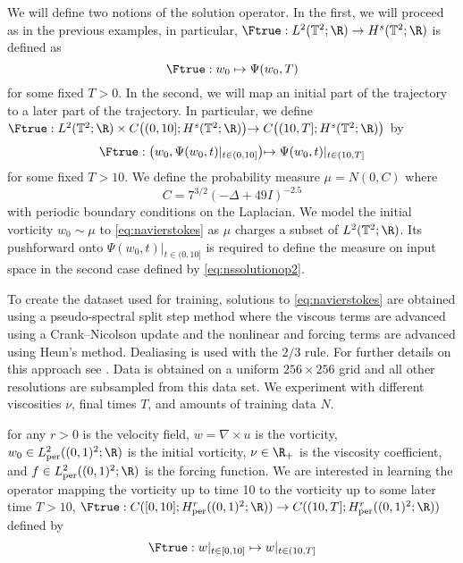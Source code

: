 We will define two notions of the solution operator. In the first, we will proceed as in the previous examples, in particular, \(\Ftrue : L^2(\mathbb{T}^2;\R) \to H^s(\mathbb{T}^2;\R)\) is defined as
\begin{equation}
\label{eq:nssolutionop_add}
\Ftrue : w_0 \mapsto \Psi(w_0, T)
\end{equation}
for some fixed \(T > 0\). In the second, we will map an initial part of the trajectory to a later part of the trajectory. In particular, we define
\(\Ftrue : L^2(\mathbb{T}^2;\R) \times C \bigl ( (0,10]; H^s(\mathbb{T}^2;\R) \bigl) \to C \bigl( (10,T]; H^s(\mathbb{T}^2;\R) \bigl)\) by
\begin{equation}
    \label{eq:nssolutionop2}
    \Ftrue : \bigl ( w_0, \Psi(w_0,t)|_{t \in (0,10]} \bigl) \mapsto \Psi(w_0,t)|_{t \in (10,T]}
\end{equation}
for some fixed  \(T > 10\). We define the probability measure \(\mu = N(0,C)\)
where 
\[C = 7^{3/2}  (-\Delta + 49I)^{-2.5} \]
with periodic boundary conditions on the Laplacian. We model the initial vorticity \(w_0 \sim \mu\) to \eqref{eq:navierstokes} as \(\mu\) charges a subset of \(L^2(\mathbb{T}^2;\R)\).
Its pushforward onto $\Psi(w_0,t)|_{t \in (0,10]}$ is required to define the measure on
input space in the second case defined by \eqref{eq:nssolutionop2}.

To create the dataset used for training, solutions to \eqref{eq:navierstokes} are obtained using a pseudo-spectral split step method where the viscous terms are advanced using a Crank–Nicolson update and the nonlinear and forcing terms are advanced using Heun's method. Dealiasing is used with the \(2/3\) rule. For further details on this approach see \citep{chandler2013invariant}. Data is obtained on a uniform \(256 \times 256\) grid and all other resolutions are subsampled from this data set. We experiment with different viscosities \(\nu\), final times \(T\), and amounts of training data \(N\).

\iffalse
for any $r>0$ is the velocity field, $w = \nabla \times u$ is the vorticity, $w_0 \in L^2_{\text{per}}((0,1)^2;\R)$ is the initial vorticity,  $\nu \in \R_+$ is the viscosity coefficient, and $f \in L^2_{\text{per}}((0,1)^2;\R)$ is the forcing function. We are interested in learning the operator mapping the vorticity up to time 10 to the vorticity up to some later time $T > 10$,
$\Ftrue: C([0,10]; H^r_{\text{per}}((0,1)^2; \R)) \to C((10,T]; H^r_{\text{per}}((0,1)^2; \R))$
defined by 
\[\Ftrue: w|_{t \in [0,10]} \mapsto w|_{t \in (10,T]}\]

